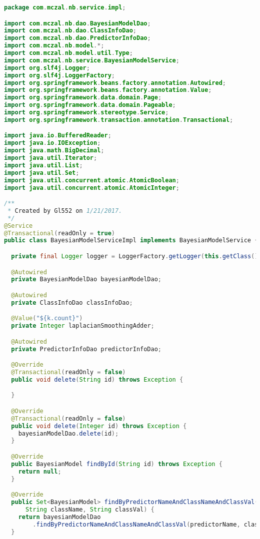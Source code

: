 \begin{lstlisting}[language=Java,basicstyle=\tiny,caption=BayesianModelService.java]
package com.mczal.nb.service.impl;

import com.mczal.nb.dao.BayesianModelDao;
import com.mczal.nb.dao.ClassInfoDao;
import com.mczal.nb.dao.PredictorInfoDao;
import com.mczal.nb.model.*;
import com.mczal.nb.model.util.Type;
import com.mczal.nb.service.BayesianModelService;
import org.slf4j.Logger;
import org.slf4j.LoggerFactory;
import org.springframework.beans.factory.annotation.Autowired;
import org.springframework.beans.factory.annotation.Value;
import org.springframework.data.domain.Page;
import org.springframework.data.domain.Pageable;
import org.springframework.stereotype.Service;
import org.springframework.transaction.annotation.Transactional;

import java.io.BufferedReader;
import java.io.IOException;
import java.math.BigDecimal;
import java.util.Iterator;
import java.util.List;
import java.util.Set;
import java.util.concurrent.atomic.AtomicBoolean;
import java.util.concurrent.atomic.AtomicInteger;

/**
 * Created by Gl552 on 1/21/2017.
 */
@Service
@Transactional(readOnly = true)
public class BayesianModelServiceImpl implements BayesianModelService {

  private final Logger logger = LoggerFactory.getLogger(this.getClass());

  @Autowired
  private BayesianModelDao bayesianModelDao;

  @Autowired
  private ClassInfoDao classInfoDao;

  @Value("${k.count}")
  private Integer laplacianSmoothingAdder;

  @Autowired
  private PredictorInfoDao predictorInfoDao;

  @Override
  @Transactional(readOnly = false)
  public void delete(String id) throws Exception {

  }

  @Override
  @Transactional(readOnly = false)
  public void delete(Integer id) throws Exception {
    bayesianModelDao.delete(id);
  }

  @Override
  public BayesianModel findById(String id) throws Exception {
    return null;
  }

  @Override
  public Set<BayesianModel> findByPredictorNameAndClassNameAndClassVal(String predictorName,
      String className, String classVal) {
    return bayesianModelDao
        .findByPredictorNameAndClassNameAndClassVal(predictorName, className, classVal);
  }


\end{lstlisting}
